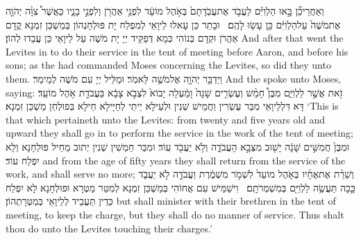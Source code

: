 {וְאַחֲרֵי\maqqaf כֵ֞ן בָּ֣אוּ הַלְוִיִּ֗ם לַעֲבֹ֤ד אֶת\maqqaf עֲבֹֽדָתָם֙ בְּאֹ֣הֶל מוֹעֵ֔ד לִפְנֵ֥י אַהֲרֹ֖ן וְלִפְנֵ֣י בָנָ֑יו כַּאֲשֶׁר֩ צִוָּ֨ה יְהֹוָ֤ה אֶת\maqqaf מֹשֶׁה֙ עַל\maqqaf הַלְוִיִּ֔ם כֵּ֖ן עָשׂ֥וּ לָהֶֽם׃ \setuma }
{וּבָתַר כֵּן עָאלוּ לֵיוָאֵי לְמִפְלַח יָת פּוּלְחָנְהוֹן בְּמַשְׁכַּן זִמְנָא קֳדָם אַהֲרֹן וּקְדָם בְּנוֹהִי כְּמָא דְּפַקֵּיד יְיָ יָת מֹשֶׁה עַל לֵיוָאֵי כֵּן עֲבַדוּ לְהוֹן׃}
{And after that went the Levites in to do their service in the tent of meeting before Aaron, and before his sons; as the \lord\space had commanded Moses concerning the Levites, so did they unto them.}{}
{וַיְדַבֵּ֥ר יְהֹוָ֖ה אֶל\maqqaf מֹשֶׁ֥ה לֵּאמֹֽר׃}
{וּמַלֵּיל יְיָ עִם מֹשֶׁה לְמֵימַר׃}
{And the \lord\space spoke unto Moses, saying:}{}
{זֹ֖את אֲשֶׁ֣ר לַלְוִיִּ֑ם מִבֶּן֩ חָמֵ֨שׁ וְעֶשְׂרִ֤ים שָׁנָה֙ וָמַ֔עְלָה יָבוֹא֙ לִצְבֹ֣א צָבָ֔א בַּעֲבֹדַ֖ת אֹ֥הֶל מוֹעֵֽד׃}
{דָּא דִּלְלֵיוָאֵי מִבַּר עֶשְׂרִין וַחֲמֵישׁ שְׁנִין וּלְעֵילָא יֵיתֵי לְחַיָּילָא חֵילָא בְּפוּלְחַן מַשְׁכַּן זִמְנָא׃}
{‘This is that which pertaineth unto the Levites: from twenty and five years old and upward they shall go in to perform the service in the work of the tent of meeting;}{}
{וּמִבֶּן֙ חֲמִשִּׁ֣ים שָׁנָ֔ה יָשׁ֖וּב מִצְּבָ֣א הָעֲבֹדָ֑ה וְלֹ֥א יַעֲבֹ֖ד עֽוֹד׃}
{וּמִבַּר חַמְשִׁין שְׁנִין יְתוּב מֵחֵיל פּוּלְחָנָא וְלָא יִפְלַח עוֹד׃}
{and from the age of fifty years they shall return from the service of the work, and shall serve no more;}{}
{וְשֵׁרֵ֨ת אֶת\maqqaf אֶחָ֜יו בְּאֹ֤הֶל מוֹעֵד֙ לִשְׁמֹ֣ר מִשְׁמֶ֔רֶת וַעֲבֹדָ֖ה לֹ֣א יַעֲבֹ֑ד כָּ֛כָה תַּעֲשֶׂ֥ה לַלְוִיִּ֖ם בְּמִשְׁמְרֹתָֽם׃ \petucha }
{וִישַׁמֵּישׁ עִם אֲחוֹהִי בְּמַשְׁכַּן זִמְנָא לְמִטַּר מַטְּרָא וּפוּלְחָנָא לָא יִפְלַח כְּדֵין תַּעֲבֵיד לְלֵיוָאֵי בְּמַטְּרָתְהוֹן׃}
{but shall minister with their brethren in the tent of meeting, to keep the charge, but they shall do no manner of service. Thus shalt thou do unto the Levites touching their charges.’}{}
